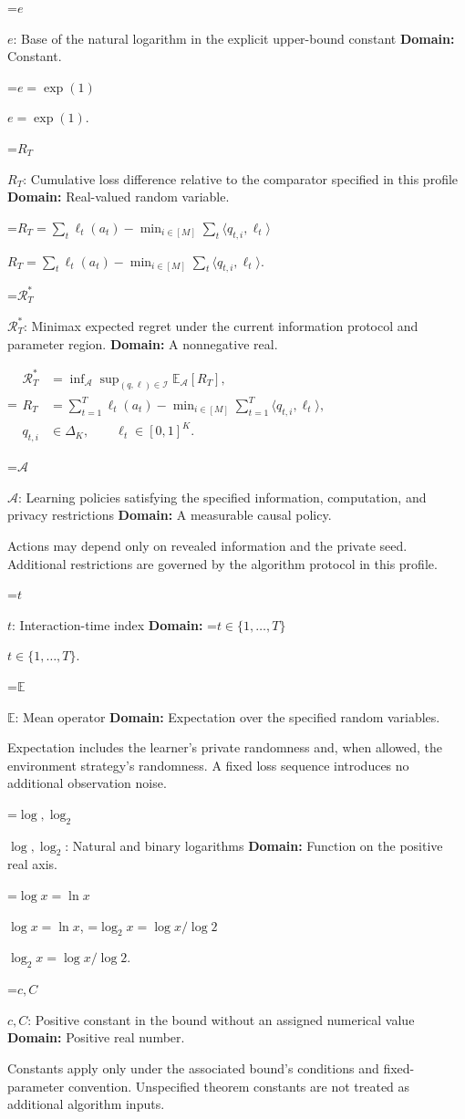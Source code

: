 \documentclass[10pt,a4paper]{article}
\newcommand{\AtlasMath}[1]{\par\begingroup\centering\setbox0=\hbox{$\displaystyle #1$}\ifdim\wd0>1.4\linewidth\typeout{ATLAS WIDE FORMULA: \the\wd0}\fi\ifdim\wd0>\linewidth\resizebox{\linewidth}{!}{\box0}\else\box0\fi\par\endgroup}
\newcommand{\AtlasInlineMath}[1]{\begingroup\setbox0=\hbox{$#1$}\ifdim\wd0>.4\linewidth\endgroup\AtlasMath{#1}\else\endgroup$#1$\fi}
\begin{document}
\AtlasInlineMath{e}: Base of the natural logarithm in the explicit upper-bound constant \textbf{Domain:} Constant.

\AtlasInlineMath{e=\exp(1)}.

\AtlasInlineMath{R_T}: Cumulative loss difference relative to the comparator specified in this profile \textbf{Domain:} Real-valued random variable.

\AtlasInlineMath{R_T=\sum_t\ell_t(a_t)-\min_{i\in[M]}\sum_t\langle q_{t,i},\ell_t\rangle}.

\AtlasInlineMath{\mathcal R_T^*}: Minimax expected regret under the current information protocol and parameter region. \textbf{Domain:} A nonnegative real.


\AtlasMath{\begin{aligned}\mathcal R_T^*&=\inf_{\mathcal A}\sup_{(q,\ell)\in\mathcal I}\mathbb E_{\mathcal A}[R_T],\\ R_T&=\sum_{t=1}^T\ell_t(a_t)-\min_{i\in[M]}\sum_{t=1}^T\langle q_{t,i},\ell_t\rangle,\\ q_{t,i}&\in\Delta_K,\qquad\ell_t\in[0,1]^K.\end{aligned}}


\AtlasInlineMath{\mathcal A}: Learning policies satisfying the specified information, computation, and privacy restrictions \textbf{Domain:} A measurable causal policy.

Actions may depend only on revealed information and the private seed. Additional restrictions are governed by the algorithm protocol in this profile.

\AtlasInlineMath{t}: Interaction-time index \textbf{Domain:} \AtlasInlineMath{t\in\{1,\ldots,T\}}.

\AtlasInlineMath{\mathbb E}: Mean operator \textbf{Domain:} Expectation over the specified random variables.

Expectation includes the learner's private randomness and, when allowed, the environment strategy's randomness. A fixed loss sequence introduces no additional observation noise.

\AtlasInlineMath{\log,\log_2}: Natural and binary logarithms \textbf{Domain:} Function on the positive real axis.

\AtlasInlineMath{\log x=\ln x}, \AtlasInlineMath{\log_2x=\log x/\log2}.

\AtlasInlineMath{c,C}: Positive constant in the bound without an assigned numerical value \textbf{Domain:} Positive real number.

Constants apply only under the associated bound’s conditions and fixed-parameter convention. Unspecified theorem constants are not treated as additional algorithm inputs.
\end{document}
